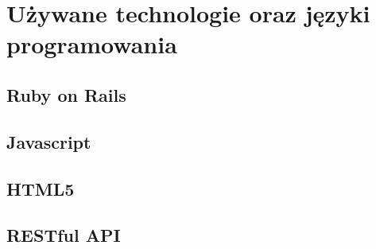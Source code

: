 \chapter{Używane technologie oraz języki programowania}
\label{cha:uzywaneTechnologie}

\section{Ruby on Rails}
\label{sec:rubyOnRails}

\section{Javascript}
\label{sec:javascript}

\section{HTML5}
\label{sec;html5}

\section{RESTful API}
\label{sec;rest}
